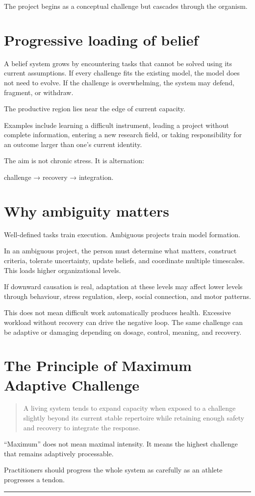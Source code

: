 The project begins as a conceptual challenge but cascades through the organism.

\section{Progressive loading of belief}

A belief system grows by encountering tasks that cannot be solved using its current assumptions. If every challenge fits the existing model, the model does not need to evolve. If the challenge is overwhelming, the system may defend, fragment, or withdraw.

The productive region lies near the edge of current capacity.

Examples include learning a difficult instrument, leading a project without complete information, entering a new research field, or taking responsibility for an outcome larger than one's current identity.

The aim is not chronic stress. It is alternation:

challenge → recovery → integration.

\section{Why ambiguity matters}

Well-defined tasks train execution. Ambiguous projects train model formation.

In an ambiguous project, the person must determine what matters, construct criteria, tolerate uncertainty, update beliefs, and coordinate multiple timescales. This loads higher organizational levels.

If downward causation is real, adaptation at these levels may affect lower levels through behaviour, stress regulation, sleep, social connection, and motor patterns.

This does not mean difficult work automatically produces health. Excessive workload without recovery can drive the negative loop. The same challenge can be adaptive or damaging depending on dosage, control, meaning, and recovery.

\section{The Principle of Maximum Adaptive Challenge}

\begin{quote}
A living system tends to expand capacity when exposed to a challenge slightly beyond its current stable repertoire while retaining enough safety and recovery to integrate the response.
\end{quote}

``Maximum'' does not mean maximal intensity. It means the highest challenge that remains adaptively processable.

Practitioners should progress the whole system as carefully as an athlete progresses a tendon.

\begin{center}\rule{0.5\linewidth}{0.5pt}\end{center}
